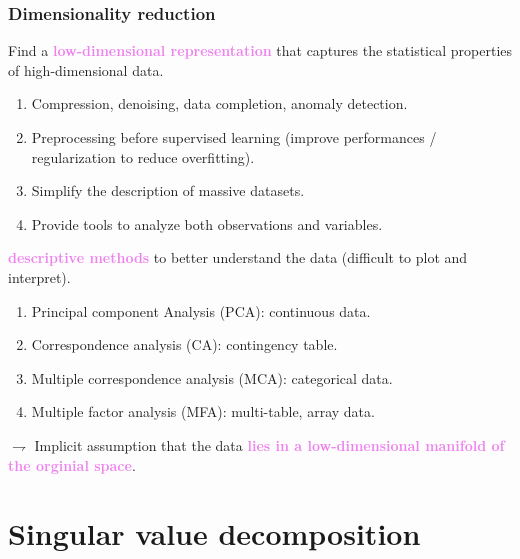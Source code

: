\documentclass[9pt]{beamer}
\begin{document}
\begin{frame}
\frametitle{Dimensionality reduction}
\vfill
\small{
Find a \textcolor{violet}{{\bf low-dimensional representation}} that captures the statistical properties of high-dimensional data.
\vfill
\begin{enumerate}[-]
\item \textcolor{lighto}{Compression}, denoising,  data completion,  anomaly detection. 
\item \textcolor{lighto}{Preprocessing before supervised learning} (improve performances / regularization to reduce overfitting).	
\item \textcolor{lighto}{Simplify the description} of massive datasets.
\item Provide tools to analyze \textcolor{lighto}{both observations and variables}.
\end{enumerate}
\vfill
\textcolor{violet}{{\bf descriptive methods}} to better understand the data (difficult to plot and interpret).

\begin{enumerate}[-]
\item \textcolor{lighto}{Principal component Analysis (PCA)}: continuous data.
\item \textcolor{lighto}{Correspondence analysis (CA)}: contingency table.
\item \textcolor{lighto}{Multiple correspondence analysis (MCA)}: categorical data.
\item \textcolor{lighto}{Multiple factor analysis (MFA)}: multi-table, array data. \vfill
\end{enumerate}

$\rightharpoondown$ Implicit assumption that the data \textcolor{violet}{{\bf lies in a low-dimensional manifold of the orginial space}}.
}
\normalsize
\end{frame}

\section{Singular value decomposition}
\end{document}
